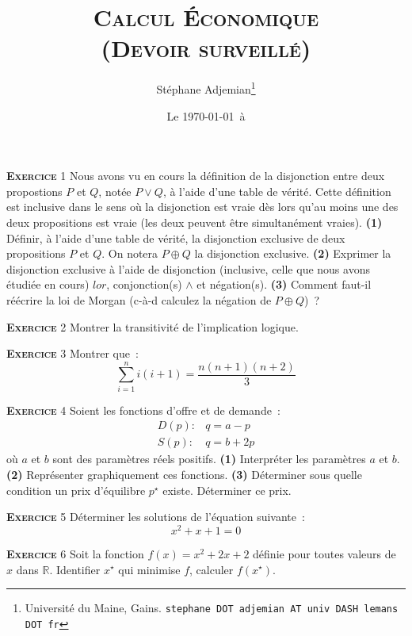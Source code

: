 \documentclass[10pt,a4paper,notitlepage]{article}
\newcommand{\exercice}[1]{\textsc{\textbf{Exercice}} #1}
\providecommand{\lxor}{\oplus}
\begin{document}
\title{\textsc{Calcul Économique\\ \small{(Devoir surveillé)}}}
\author{Stéphane Adjemian\thanks{Université du Maine, Gains. \texttt{stephane DOT adjemian AT univ DASH lemans DOT fr}}}
\date{Le \today\ à \thistime}

\maketitle

\exercice{1} Nous avons vu en cours la définition de la disjonction
entre deux propostions $P$ et $Q$, notée $P \lor Q$, à l'aide d'une
table de vérité. Cette définition est inclusive dans le sens où la
disjonction est vraie dès lors qu'au moins une des deux propositions
est vraie (les deux peuvent être simultanément vraies). \textbf{(1)}
Définir, à l'aide d'une table de vérité, la disjonction exclusive
de deux propositions $P$ et $Q$. On notera $P \lxor Q$ la
disjonction exclusive. \textbf{(2)} Exprimer la disjonction exclusive à
l'aide de disjonction (inclusive, celle que nous avons étudiée en
cours) $lor$, conjonction(s) $\land$ et négation(s). \textbf{(3)}
Comment faut-il réécrire la loi de Morgan (c-à-d calculez la négation de
$P\lxor Q$) ?

\bigskip

\exercice{2} Montrer la transitivité de l'implication logique.

\bigskip

\exercice{3} Montrer que :
\[
  \sum_{i=1}^n i(i+1) = \frac{n(n+1)(n+2)}{3}
\]

\bigskip

\exercice{4} Soient les fonctions d'offre et de demande :
\[
\begin{split}
  D(p):& q = a - p\\
  S(p):& q = b + 2p
\end{split}
\] 
où $a$ et $b$ sont des paramètres réels positifs. \textbf{(1)} Interpréter les
paramètres $a$ et $b$. \textbf{(2)} Représenter graphiquement ces
fonctions. \textbf{(3)} Déterminer sous quelle condition un prix d'équilibre
$p^{\star}$ existe. Déterminer ce prix.

\bigskip

\exercice{5} Déterminer les solutions de l'équation suivante :
\[
x^2 + x + 1 = 0
\]

\bigskip

\exercice{6} 
Soit la fonction $f(x) = x^2+2x+2$ définie pour toutes valeurs de $x$
dans $\mathbb R$. Identifier $x^{\star}$ qui minimise $f$, calculer $f(x^{\star})$.
\end{document}
